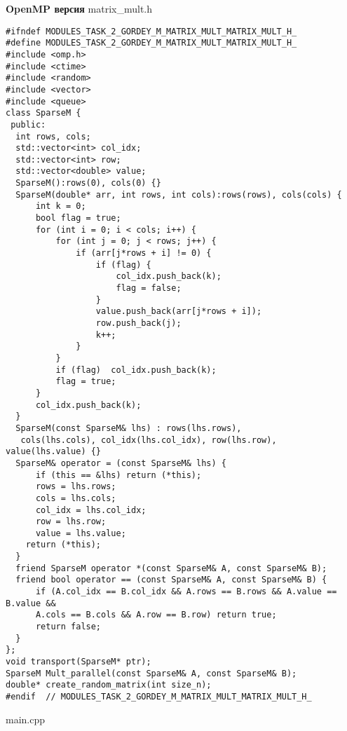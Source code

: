 \documentclass{report}
\begin{document}
\textbf{OpenMP версия}
\newline
\newline matrix\_mult.h
\begin{lstlisting}
#ifndef MODULES_TASK_2_GORDEY_M_MATRIX_MULT_MATRIX_MULT_H_
#define MODULES_TASK_2_GORDEY_M_MATRIX_MULT_MATRIX_MULT_H_
#include <omp.h>
#include <ctime>
#include <random>
#include <vector>
#include <queue>
class SparseM {
 public:
  int rows, cols;
  std::vector<int> col_idx;
  std::vector<int> row;
  std::vector<double> value;
  SparseM():rows(0), cols(0) {}
  SparseM(double* arr, int rows, int cols):rows(rows), cols(cols) {
      int k = 0;
      bool flag = true;
      for (int i = 0; i < cols; i++) {
          for (int j = 0; j < rows; j++) {
              if (arr[j*rows + i] != 0) {
                  if (flag) {
                      col_idx.push_back(k);
                      flag = false;
                  }
                  value.push_back(arr[j*rows + i]);
                  row.push_back(j);
                  k++;
              }
          }
          if (flag)  col_idx.push_back(k);
          flag = true;
      }
      col_idx.push_back(k);
  }
  SparseM(const SparseM& lhs) : rows(lhs.rows),
   cols(lhs.cols), col_idx(lhs.col_idx), row(lhs.row), value(lhs.value) {}
  SparseM& operator = (const SparseM& lhs) {
      if (this == &lhs) return (*this);
      rows = lhs.rows;
      cols = lhs.cols;
      col_idx = lhs.col_idx;
      row = lhs.row;
      value = lhs.value;
    return (*this);
  }
  friend SparseM operator *(const SparseM& A, const SparseM& B);
  friend bool operator == (const SparseM& A, const SparseM& B) {
      if (A.col_idx == B.col_idx && A.rows == B.rows && A.value == B.value &&
      A.cols == B.cols && A.row == B.row) return true;
      return false;
  }
};
void transport(SparseM* ptr);
SparseM Mult_parallel(const SparseM& A, const SparseM& B);
double* create_random_matrix(int size_n);
#endif  // MODULES_TASK_2_GORDEY_M_MATRIX_MULT_MATRIX_MULT_H_
\end{lstlisting}
main.cpp
\end{document}
